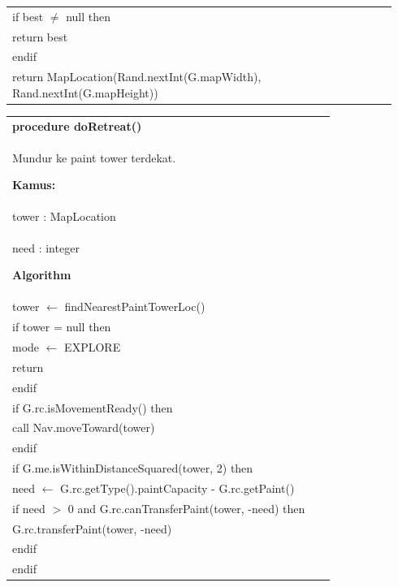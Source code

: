 \documentclass{article}
\newenvironment{pseudobox}
{
\centering
\begin{longtable}{|p{0.94\linewidth}|}
\hline
}
{
\\ \hline
\end{longtable}
\vspace{0.05cm}
}
\begin{document}
\begin{pseudobox}
\hspace*{1em} if best $\neq$ null then \\
\hspace*{2em} return best \\
\hspace*{1em} endif \\

\hspace*{1em} return MapLocation(Rand.nextInt(G.mapWidth), Rand.nextInt(G.mapHeight))
\end{pseudobox}

\begin{pseudobox}
\textbf{procedure doRetreat()} \\
{ Mundur ke paint tower terdekat. }

\textbf{Kamus:} \\
\hspace*{1em} tower : MapLocation \\
\hspace*{1em} need : integer

\textbf{Algorithm} \\
\hspace*{1em} tower $\leftarrow$ findNearestPaintTowerLoc() \\

\hspace*{1em} if tower = null then \\
\hspace*{2em} mode $\leftarrow$ EXPLORE \\
\hspace*{2em} return \\
\hspace*{1em} endif \\

\hspace*{1em} if G.rc.isMovementReady() then \\
\hspace*{2em} call Nav.moveToward(tower) \\
\hspace*{1em} endif \\

\hspace*{1em} if G.me.isWithinDistanceSquared(tower, 2) then \\
\hspace*{2em} need $\leftarrow$ G.rc.getType().paintCapacity - G.rc.getPaint() \\
\hspace*{2em} if need $>$ 0 and G.rc.canTransferPaint(tower, -need) then \\
\hspace*{3em} G.rc.transferPaint(tower, -need) \\
\hspace*{2em} endif \\
\hspace*{1em} endif
\end{pseudobox}
\end{document}

